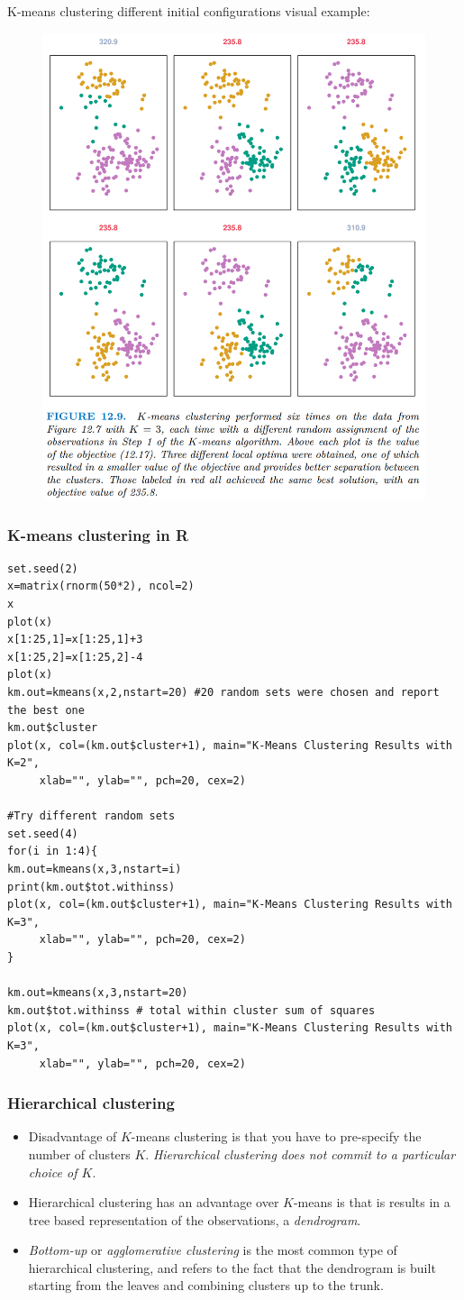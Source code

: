 \documentclass[11pt]{article}
\begin{document}
\noindent K-means clustering different initial configurations visual example:
\begin{figure}[H]
    \centering
    \includegraphics[width=0.5\linewidth]{K-means clustering different initial visual example.png}
\end{figure}

\subsubsection{K-means clustering in R}
\begin{lstlisting}
set.seed(2)
x=matrix(rnorm(50*2), ncol=2)
x
plot(x)
x[1:25,1]=x[1:25,1]+3
x[1:25,2]=x[1:25,2]-4
plot(x)
km.out=kmeans(x,2,nstart=20) #20 random sets were chosen and report the best one
km.out$cluster 
plot(x, col=(km.out$cluster+1), main="K-Means Clustering Results with K=2", 
     xlab="", ylab="", pch=20, cex=2)

#Try different random sets
set.seed(4)
for(i in 1:4){
km.out=kmeans(x,3,nstart=i)
print(km.out$tot.withinss)
plot(x, col=(km.out$cluster+1), main="K-Means Clustering Results with K=3", 
     xlab="", ylab="", pch=20, cex=2)
}

km.out=kmeans(x,3,nstart=20)
km.out$tot.withinss # total within cluster sum of squares
plot(x, col=(km.out$cluster+1), main="K-Means Clustering Results with K=3", 
     xlab="", ylab="", pch=20, cex=2)
\end{lstlisting}

\subsubsection{Hierarchical clustering}
\begin{itemize}
    \item Disadvantage of $K$-means clustering is that you have to pre-specify the number of clusters $K$. \textit{Hierarchical clustering does not commit to a particular choice of $K$}.
    \item Hierarchical clustering has an advantage over $K$-means is that is results in a tree based representation of the observations, a \textit{dendrogram}.
    \item \textit{Bottom-up} or \textit{agglomerative clustering} is the most common type of hierarchical clustering, and refers to the fact that the dendrogram is built starting from the leaves and combining clusters up to the trunk.
\end{itemize}
\end{document}
